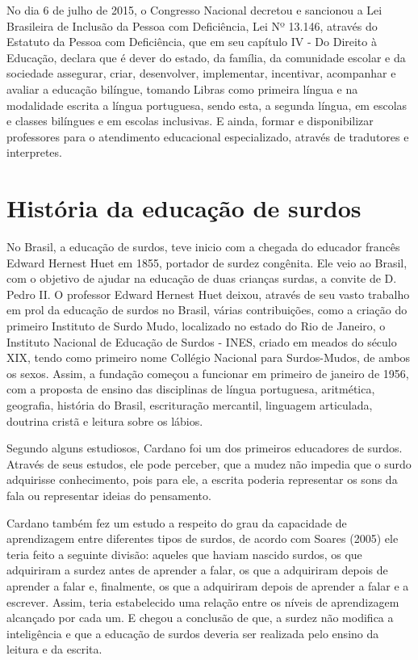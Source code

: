 \documentclass[brasil]{abnt}
\begin{document}
		No dia 6 de julho de 2015, o Congresso Nacional decretou e sancionou a Lei Brasileira de Inclusão da Pessoa com Deficiência, Lei Nº 13.146, através do Estatuto da Pessoa com Deficiência, que em seu 
		capítulo IV - Do Direito à Educação, declara que é dever do estado, da família, da comunidade escolar e da sociedade assegurar, criar, desenvolver, implementar, incentivar, acompanhar e avaliar a 
		educação bilíngue, tomando Libras como primeira língua e na modalidade escrita a língua portuguesa, sendo esta, a segunda língua, em escolas e classes bilíngues e em escolas inclusivas. E ainda, formar
		e disponibilizar professores para o atendimento educacional especializado, através de tradutores e interpretes.   
				

\chapter{História da educação de surdos}
	
	No Brasil, a educação de surdos, teve inicio com a chegada do educador francês Edward Hernest Huet em 1855, portador de surdez congênita. Ele veio ao Brasil, com o objetivo de ajudar na educação de duas 
	crianças surdas, a convite de D. Pedro II. O professor Edward Hernest Huet deixou, através de seu vasto trabalho em prol da educação de surdos no Brasil, várias contribuições, como a criação do primeiro 
	Instituto de Surdo Mudo, localizado no estado do Rio de Janeiro, o Instituto Nacional de Educação de Surdos - INES, criado em meados do século 
	XIX, tendo como primeiro nome Collégio Nacional para Surdos-Mudos, de ambos os sexos. Assim, a fundação começou a funcionar em primeiro de janeiro de 1956, com a proposta de ensino das disciplinas de língua 
	portuguesa, aritmética, geografia, história do Brasil, escrituração mercantil, linguagem articulada, doutrina cristã e leitura sobre os lábios.    	
	
	Segundo alguns estudiosos, Cardano foi um dos primeiros educadores de surdos. Através de seus estudos, ele pode perceber, que a mudez não impedia que o surdo adquirisse conhecimento, pois para ele, a 
	escrita poderia representar os sons da fala ou representar ideias do pensamento. 
	
	Cardano também fez um estudo a respeito do grau da capacidade de aprendizagem entre diferentes tipos de surdos, de acordo com Soares (2005) ele teria feito a seguinte divisão: aqueles que haviam 
	nascido surdos, os que adquiriram a surdez antes de aprender a falar, os que a adquiriram depois de aprender a falar e, finalmente, os que a adquiriram depois de aprender a falar e a escrever. 
	Assim, teria estabelecido uma relação entre os níveis de aprendizagem alcançado por cada um. E chegou a conclusão de que, a surdez não modifica a inteligência e que a educação de surdos deveria ser 
	realizada pelo ensino da leitura e da escrita.
	
\end{document}
